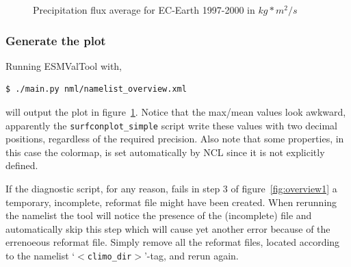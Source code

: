 \documentclass[12pt]{article}
\newcommand{\xmltag}[1]{\texttt{$<$#1$>$}}
\begin{document}
%
%
\begin{figure}[b!]
\begin{center}
\caption{Precipitation flux average for EC-Earth 1997-2000 in
$kg*m^2/s$}\label{fig:surfconplot_pr}
\end{center}
\end{figure}


\subsubsection{Generate the plot}\label{subsubsection:runESMValTool}
Running ESMValTool with, 
\begin{Verbatim}[frame=single, fontsize=\footnotesize]
$ ./main.py nml/namelist_overview.xml
\end{Verbatim}
will output the plot in figure~\ref{fig:surfconplot_pr}. Notice that
the max/mean values look awkward, apparently the
\texttt{surfconplot\_simple} script write these values with two
decimal positions, regardless of the required precision. Also note
that some properties, in this case the colormap, is set automatically
by NCL since it is not explicitly defined.

If the diagnostic script, for any reason, fails in step 3 of
figure~\ref{fig:overview1} a temporary, incomplete, reformat file
might have been created. When rerunning the namelist the tool will
notice the presence of the (incomplete) file and automatically skip
this step which will cause yet another error because of the errenoeous
reformat file. Simply remove all the reformat files, located according
to the namelist `\xmltag{climo\_dir}'-tag, and rerun again.
\end{document}
